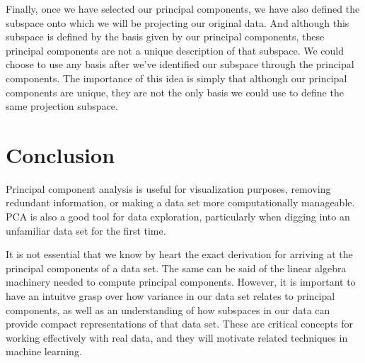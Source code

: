 Finally, once we have selected our principal components, we have also defined the subspace onto which we will be projecting our original data. And although this subspace is defined by the basis given by our principal components, these principal components are not a unique description of that subspace. We could choose to use any basis after we've identified our subspace through the principal components. The importance of this idea is simply that although our principal components are unique, they are not the only basis we could use to define the same projection subspace.

\section{Conclusion}
Principal component analysis is useful for visualization purposes, removing redundant information, or making a data set more computationally manageable. PCA is also a good tool for data exploration, particularly when digging into an unfamiliar data set for the first time.

It is not essential that we know by heart the exact derivation for arriving at the principal components of a data set. The same can be said of the linear algebra machinery needed to compute principal components. However, it is important to have an intuitve grasp over how variance in our data set relates to principal components, as well as an understanding of how subspaces in our data can provide compact representations of that data set. These are critical concepts for working effectively with real data, and they will motivate related techniques in machine learning.
